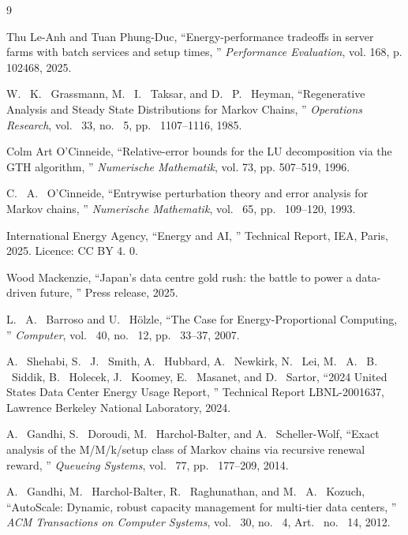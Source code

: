 \documentclass[a4paper, 11pt, dvipdfmx]{jsreport}
\begin{document}
\appendix


\begin{thebibliography}{9}

Thu Le-Anh and Tuan Phung-Duc, 
``Energy-performance tradeoffs in server farms with batch services and setup times, '' 
\textit{Performance Evaluation}, vol.  168, p.  102468, 2025. 

W. ~K. ~Grassmann, M. ~I. ~Taksar, and D. ~P. ~Heyman, ``Regenerative Analysis and Steady State Distributions for Markov Chains, '' \textit{Operations Research}, vol. ~33, no. ~5, pp. ~1107--1116, 1985. 

Colm Art O'Cinneide, 
``Relative-error bounds for the LU decomposition via the GTH algorithm, '' 
\textit{Numerische Mathematik}, vol.  73, pp.  507--519, 1996. 

C. ~A. ~O'Cinneide, ``Entrywise perturbation theory and error analysis for Markov chains, '' \textit{Numerische Mathematik}, vol. ~65, pp. ~109--120, 1993. 

International Energy Agency, ``Energy and {AI}, '' Technical Report, IEA, Paris, 2025.  Licence: CC BY 4. 0. 

Wood Mackenzie, ``Japan's data centre gold rush: the battle to power a data-driven future, '' Press release, 2025. 

L. ~A. ~Barroso and U. ~H{\"o}lzle, ``The Case for Energy-Proportional Computing, '' \textit{Computer}, vol. ~40, no. ~12, pp. ~33--37, 2007. 

A. ~Shehabi, S. ~J. ~Smith, A. ~Hubbard, A. ~Newkirk, N. ~Lei, M. ~A. ~B. ~Siddik, B. ~Holecek, J. ~Koomey, E. ~Masanet, and D. ~Sartor, ``2024 United States Data Center Energy Usage Report, '' Technical Report LBNL-2001637, Lawrence Berkeley National Laboratory, 2024. 

A. ~Gandhi, S. ~Doroudi, M. ~Harchol-Balter, and A. ~Scheller-Wolf, ``Exact analysis of the {M/M/k/setup} class of {M}arkov chains via recursive renewal reward, '' \textit{Queueing Systems}, vol. ~77, pp. ~177--209, 2014. 

A. ~Gandhi, M. ~Harchol-Balter, R. ~Raghunathan, and M. ~A. ~Kozuch, 
``{AutoScale}: Dynamic, robust capacity management for multi-tier data
centers, '' \textit{ACM Transactions on Computer Systems}, vol. ~30, no. ~4, 
Art. ~no. ~14, 2012. 


\end{thebibliography}
\end{document}
